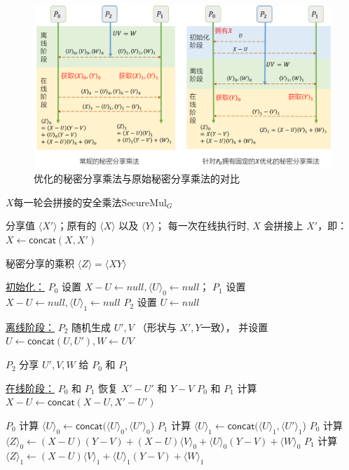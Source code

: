 \begin{figure}[h!]
    \centering
    \includegraphics[width=\linewidth]{Z_Resources/perm-llm_ssmul.png}    
    \caption{优化的秘密分享乘法与原始秘密分享乘法的对比}
    \label{fig:perm-llm:ssmul}
\end{figure}
\begin{algorithm}[h]
    \caption{$X$每一轮会拼接的安全乘法\textsf{SecureMul}$_G$}
    \label{alg:perm-llm:secure_mul_growing}
    \begin{algorithmic}[1]
    \Require 分享值 $\langle X' \rangle$；原有的 $\langle X \rangle$ 以及 $\langle Y \rangle$；
    每一次在线执行时, $X$ 会拼接上 $X'$，即：$X \gets \mathsf{concat}(X, X')$
    
    \Ensure 秘密分享的乘积 $\langle Z \rangle =\langle XY \rangle$
    
    \item[\underline{初始化：}]
    \State 
        $P_0$ 设置 $X - U \gets null, \langle U \rangle_0 \gets null$；
        $P_1$ 设置 $X - U \gets null, \langle U \rangle_1 \gets null$
    \State $P_2$ 设置 $U \gets null$
    
    
    \item[\underline{离线阶段：}]
    \State $P_2$ 随机生成 $U', V$ （形状与 $X', Y$一致）， 并设置 $U\gets \mathsf{concat}(U, U'), W \gets UV$
    
    \State $P_2$ 分享 $U', V, W$ 给 $P_0$ 和 $P_1$
    
    \item[\underline{在线阶段：}]
    \State $P_0$ 和 $P_1$ 恢复 $X' - U'$ 和 $Y - V$
    \State $P_0$ 和 $P_1$ 计算 $X - U \gets \mathsf{concat}(X - U, X'-U')$
    
    \State 
        $P_0$ 计算 $\langle U \rangle_0 \gets \mathsf{concat}(\langle U \rangle_0, \langle U' \rangle_0$)
        $P_1$ 计算 $\langle U \rangle_1 \gets \mathsf{concat}(\langle U \rangle_1, \langle U' \rangle_1$)
    \State $P_0$ 计算 $\langle Z \rangle_0 \gets (X-U)(Y-V) + (X-U)\langle V \rangle_0 + \langle U\rangle_0(Y-V) + \langle W \rangle_0$
    \State $P_1$ 计算 $\langle Z \rangle_1 \gets (X-U) \langle V \rangle_1 + \langle U\rangle_1(Y-V) + \langle W \rangle_1$
    \end{algorithmic}
    \end{algorithm}

